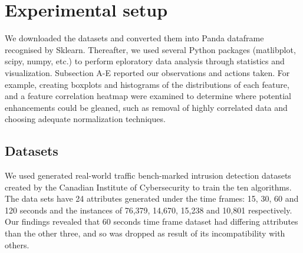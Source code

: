 \documentclass[conference]{IEEEtran}
\begin{document}
\section{Experimental setup}
We downloaded the datasets and converted them into Panda dataframe recognised by Sklearn. Thereafter, we used several Python packages (matlibplot, scipy, numpy, etc.) to perform eploratory data analysis through statistics and  visualization. Subsection A-E reported our observations and actions taken. For example, creating boxplots and histograms of the distributions of each feature, and a feature correlation heatmap were examined to determine where potential enhancements could be gleaned, such as removal of highly correlated data and choosing adequate normalization techniques.

\subsection{Datasets}
We used generated real-world traffic bench-marked intrusion detection datasets created by the Canadian Institute of Cybersecurity to train the ten  algorithms. The data sets have 24 attributes generated under the time frames: 15, 30, 60 and 120 seconds and the instances of 76,379, 14,670, 15,238 and 10,801 respectively. Our findings revealed that 60 seconds time frame dataset had differing attributes than the other three, and so was dropped as result of its incompatibility with others.
\end{document}
